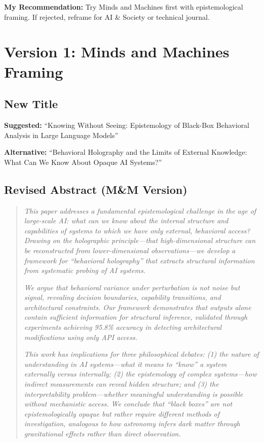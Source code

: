 \documentclass[12pt]{article}
\begin{document}
\textbf{My Recommendation:} Try Minds and Machines first with epistemological framing. If rejected, reframe for AI \& Society or technical journal.

\section{Version 1: Minds and Machines Framing}

\subsection{New Title}

\textbf{Suggested:} ``Knowing Without Seeing: Epistemology of Black-Box Behavioral Analysis in Large Language Models''

\textbf{Alternative:} ``Behavioral Holography and the Limits of External Knowledge: What Can We Know About Opaque AI Systems?''

\subsection{Revised Abstract (M\&M Version)}

\begin{quote}
\textit{This paper addresses a fundamental epistemological challenge in the age of large-scale AI: what can we know about the internal structure and capabilities of systems to which we have only external, behavioral access? Drawing on the holographic principle—that high-dimensional structure can be reconstructed from lower-dimensional observations—we develop a framework for ``behavioral holography'' that extracts structural information from systematic probing of AI systems.}

\textit{We argue that behavioral variance under perturbation is not noise but signal, revealing decision boundaries, capability transitions, and architectural constraints. Our framework demonstrates that outputs alone contain sufficient information for structural inference, validated through experiments achieving 95.8\% accuracy in detecting architectural modifications using only API access.}

\textit{This work has implications for three philosophical debates: (1) the nature of understanding in AI systems—what it means to ``know'' a system externally versus internally; (2) the epistemology of complex systems—how indirect measurements can reveal hidden structure; and (3) the interpretability problem—whether meaningful understanding is possible without mechanistic access. We conclude that ``black boxes'' are not epistemologically opaque but rather require different methods of investigation, analogous to how astronomy infers dark matter through gravitational effects rather than direct observation.}
\end{quote}
\end{document}
